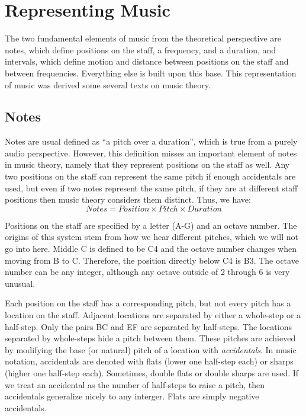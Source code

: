 \section{Representing Music}

The two fundamental elements of music from the theoretical perspective are notes, which define positions on the staff, a frequency, and a duration, 
and intervals, which define motion and distance between positions on the staff and between frequencies. Everything else is built upon this base.
This representation of music was derived some several texts on music theory. \cite{TonalHarmony, MusicTheoryPractice, MusicTheoryHandbook}

\subsection{Notes}
Notes are usual defined as ``a pitch over a duration'', which is true from a purely audio perspective.
However, this definition misses an important element of notes in music theory, namely that they represent positions on the staff as well.
Any two positions on the staff can represent the same pitch if enough accidentals are used, 
but even if two notes represent the same pitch, if they are at different staff positions then music theory considers them distinct.
Thus, we have: $$ Notes = Position \times Pitch \times Duration $$

Positions on the staff are specified by a letter (A-G) and an octave number. The origins of this system stem from how we hear different pitches, which we will not go into here.
Middle C is defined to be C4 and the octave number changes when moving from B to C. Therefore, the position directly below C4 is B3.
The octave number can be any integer, although any octave outside of 2 through 6 is very unusual.

Each position on the staff has a corresponding pitch, but not every pitch has a location on the staff. 
Adjacent locations are separated by either a whole-step or a half-step. Only the pairs BC and EF are separated by half-steps.
The locations separated by whole-steps hide a pitch between them.
These pitches are achieved by modifying the base (or natural) pitch of a location with \emph{accidentals}.
In music notation, accidentals are denoted with flats (lower one half-step each) or sharps (higher one half-step each).
Sometimes, double flats or double sharps are used.
If we treat an accidental as the number of half-steps to raise a pitch, then accidentals generalize nicely to any interger.
Flats are simply negative accidentals.

